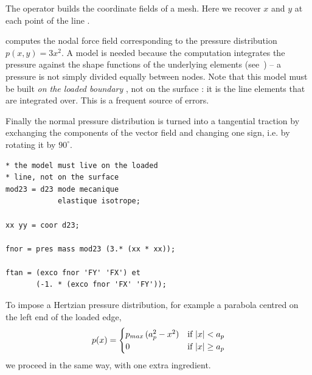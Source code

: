 \begin{castemcom}
The   operator builds the
coordinate fields of a mesh. Here we recover $x$ and $y$ at each point of the
line .

 computes the nodal force field corresponding to the pressure
distribution $p(x,y)=3x^{2}$. A model is needed because the computation
integrates the pressure against the shape functions of the underlying
elements (see~\cite{Bonnet:2007}) -- a pressure is not simply divided equally
between nodes. Note
that this model must be built \emph{on the loaded boundary} , not on
the surface : it is the line elements that are integrated over. This
is a frequent source of errors.

Finally the normal pressure distribution  is turned into a tangential
traction  by exchanging the components of the vector field and
changing one sign, i.e. by rotating it by $90^{\circ}$.
\end{castemcom}
\begin{castemlines}
\begin{verbatim}
* the model must live on the loaded
* line, not on the surface
mod23 = d23 mode mecanique
            elastique isotrope;

xx yy = coor d23;

fnor = pres mass mod23 (3.* (xx * xx));

ftan = (exco fnor 'FY' 'FX') et
       (-1. * (exco fnor 'FX' 'FY'));
\end{verbatim}
\end{castemlines}

\noindent To impose a Hertzian pressure distribution, for example a parabola
centred on the left end of the loaded edge,
\[
p(x)=\begin{cases}
p_{max}\,(a_{p}^{2}-x^{2}) & \text{if } \lvert x\rvert<a_{p}\\
0 & \text{if } \lvert x\rvert\ge a_{p}
\end{cases}
\]
we proceed in the same way, with one extra ingredient.

